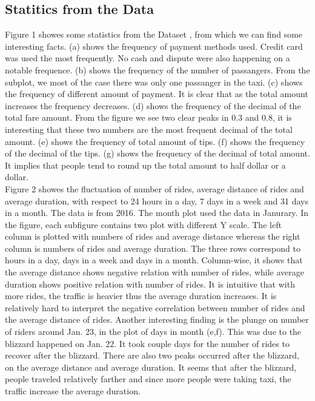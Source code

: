 \documentclass{article}
\begin{document}
\subsection{Statitics from the Data}
Figure 1 showes some statistics from the Dataset \cite{dataset}, from which we can find some interesting facts. (a) shows the frequency of payment methods used. Credit card was used the most frequently. No cash and dispute were also happening on a notable frequence. (b) shows the frequency of the number of passangers. From the subplot, we most of the case there was only one passanger in the taxi. (c) shows the frequency of different amount of payment. It is clear that as the total amount increases the frequency decreases. (d) shows the frequency of the decimal of the total fare amount. From the figure we see two clear peaks in $0.3$ and $0.8$, it is interesting that these two numbers are the most frequent decimal of the total amount. (e) shows the frequency of total amount of tips. (f) shows the frequency of the decimal of the tips. (g) shows the frequency of the decimal of total amount. It implies that people tend to round up the total amount to half dollar or a dollar. \\

Figure 2 showes the fluctuation of number of rides, average distance of rides and average duration, with respect to 24 hours in a day, 7 days in a week and 31 days in a month. The data is from 2016. The month plot used the data in Janurary. In the figure, each subfigure contains two plot with different Y scale. The left column is plotted with numbers of rides and average distance whereas the right column is numbers of rides and average duration. The three rows correspond to hours in a day, days in a week and days in a month. Column-wise, it shows that the average distance shows negative relation with number of rides, while average duration shows positive relation with number of rides. It is intuitive that with more rides, the traffic is heavier thus the average duration increases. It is relatively hard to interpret the negative correlation between number of rides and the average distance of rides. Another interesting finding is the plunge on number of riders around Jan. 23, in the plot of days in month (e,f). This was due to the blizzard happened on Jan. 22. It took couple days for the number of rides to recover after the blizzard. There are also two peaks occurred after the blizzard, on the average distance and average duration. It seems that after the blizzard, people traveled relatively farther and since more people were taking taxi, the traffic increase the average duration. 


\vfill

\medskip


\end{document}
